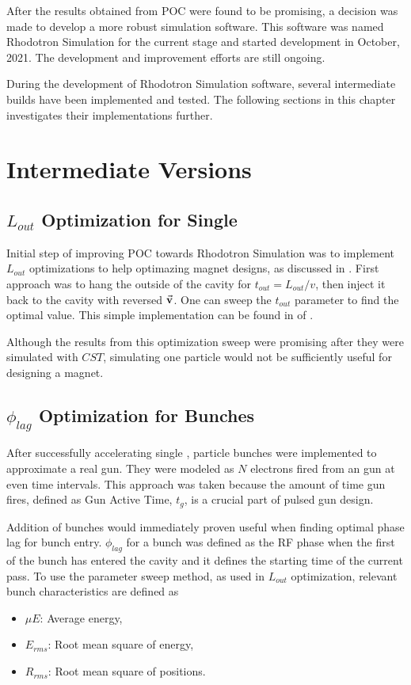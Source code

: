 \documentclass[a4paper,oneside,12pt]{report}
\numberwithin{equation}{chapter}
\begin{document}
After the results obtained from POC were found to be promising, a decision was made to develop a more robust simulation software. This software was named Rhodotron Simulation for the current stage and started development in October, 2021.
The development and improvement efforts are still ongoing. 

During the development of Rhodotron Simulation software, several intermediate builds have been implemented and tested. The following sections in this chapter investigates their implementations further.



\section{Intermediate Versions}

\subsection{$L_{out}$ Optimization for Single \e} \label{sec:lout_sweep}
Initial step of improving POC towards Rhodotron Simulation was to implement $L_{out}$ optimizations to help optimazing magnet designs, as discussed in .
First approach was to hang the \e outside of the cavity for $t_{out} = L_{out}/v$, then inject it back to the cavity with reversed $\vec{\textbf{v}}$. One can sweep the $t_{out}$ parameter to find the optimal value.
This simple implementation can be found in  of .

Although the results from this optimization sweep were promising after they were simulated with $CST$, simulating one particle would not be sufficiently useful for designing a magnet.

\subsection{$\phi_{lag}$ Optimization for Bunches} \label{sec:philag_sweep}
After successfully accelerating single \e, particle bunches were implemented to approximate a real \e gun. 
They were modeled as $N$ electrons fired from an \e gun at even time intervals. This approach was taken because the amount of time gun fires, defined as Gun Active Time, $t_g$, is a crucial part of pulsed \e gun design.

Addition of bunches would immediately proven useful when finding optimal phase lag for bunch entry.
$\phi_{lag}$ for a bunch was defined as the RF phase when the first \e of the bunch has entered the cavity and it defines the starting time of the current pass.
To use the parameter sweep method, as used in $L_{out}$ optimization, relevant bunch characteristics are defined as
\vspace{-10pt}\begin{itemize}
    \item $\mu E$: Average energy,
    \item $E_{rms}$: Root mean square of energy,
    \item $R_{rms}$: Root mean square of \e positions.
\end{itemize}
\end{document}
